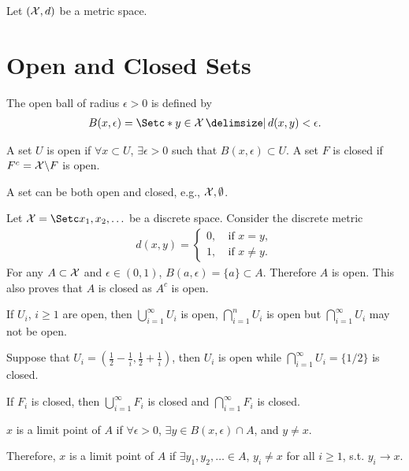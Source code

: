 \documentclass[12pt]{article}
\begin{document}

Let $(\mathcal{X}, d)$ be a metric space. 

\section{Open and Closed Sets}
\begin{Definition}
The open ball of radius $\epsilon > 0$ is defined by
\begin{align*}
B(x,\epsilon)=\set*{y \in \calX \given d(x,y)<\epsilon}.
\end{align*}
\end{Definition}

\begin{Definition}
A set $U$ is open if $\forall x \subset U$, $\exists \epsilon >0$ such that $B(x,\epsilon)\subset U$. A set $F$ is closed if $F^c = \mathcal{X}\backslash F$ is open.
\end{Definition}

A set can be both open and closed, e.g., $\mathcal{X}, \emptyset$. 

\begin{Example}\label{ex:discrete_X}
Let $\calX=\set{x_1, x_2, \ldots}$ be a discrete space. Consider the discrete metric
\begin{align*}
d(x,y)=\left\{
\begin{array}{ll}
0,&\ \text{if $x=y$}, \\
1,&\ \text{if $x\neq y$}.  
\end{array}\right.
\end{align*}
For any $A \subset \mathcal{X}$ and $\epsilon\in(0,1)$, $B(a,\epsilon)=\{a\} \subset A$. Therefore $A$ is open. This also proves that $A$ is closed as $A^c$ is open. 
\end{Example}

If $U_i$, $i\geq1$ are open, then $\bigcup_{i=1}^\infty U_i$ is open, $\bigcap_{i=1}^n U_i$ is open but $\bigcap_{i=1}^\infty U_i$ may not be open.

\begin{Example}
Suppose that $U_i=(\frac{1}{2}-\frac{1}{i},\frac{1}{2}+\frac{1}{i})$, then $U_i$ is open while $\bigcap_{i=1}^\infty U_i=\{1/2\}$ is closed.
\end{Example}

If $F_i$ is closed, then $\bigcup_{i=1}^\infty F_i$ is closed and $\bigcap_{i=1}^\infty F_i$ is closed.

\begin{Definition}
$x$ is a limit point of $A$ if $\forall \epsilon >0$, $\exists y \in B(x,\epsilon) \cap A$, and $y\neq x$.
\end{Definition}
Therefore, $x$ is a limit point of $A$ if $\exists y_1,y_2,\ldots \in A$, $y_i\ne x$ for all $i\geq1$, s.t. $y_i \to x$.
\end{document}
